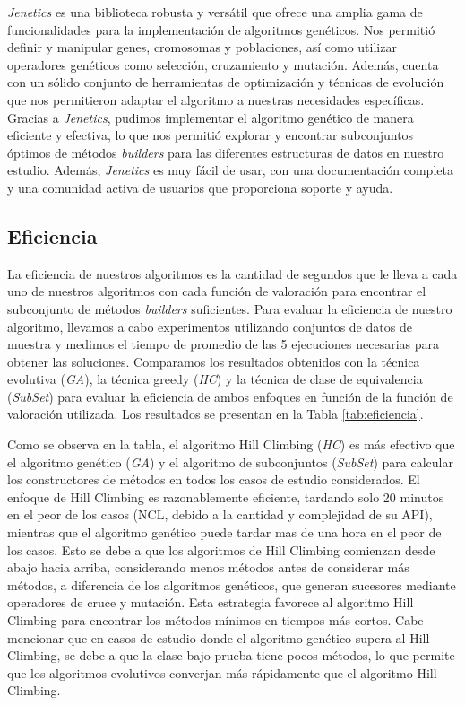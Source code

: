 \emph{Jenetics} es una biblioteca robusta y versátil que ofrece una amplia gama de funcionalidades para la implementación de algoritmos genéticos. Nos permitió definir y manipular genes, cromosomas y poblaciones, así como utilizar operadores genéticos como selección, cruzamiento y mutación. Además, cuenta con un sólido conjunto de herramientas de optimización y técnicas de evolución que nos permitieron adaptar el algoritmo a nuestras necesidades específicas.
Gracias a \emph{Jenetics}, pudimos implementar el algoritmo genético de manera eficiente y efectiva, lo que nos permitió explorar y encontrar subconjuntos óptimos de métodos \emph{builders} para las diferentes estructuras de datos en nuestro estudio. Además, \emph{Jenetics} es muy fácil de usar, con una documentación completa y una comunidad activa de usuarios que proporciona soporte y ayuda. 

\subsection{Eficiencia}
La eficiencia de nuestros algoritmos es la cantidad de segundos que le lleva a cada uno de nuestros algoritmos con cada función de valoración para encontrar el subconjunto de métodos \emph{builders} suficientes. Para evaluar la eficiencia de nuestro algoritmo, llevamos a cabo experimentos utilizando conjuntos de datos de muestra y medimos el tiempo de promedio de las 5 ejecuciones necesarias para obtener las soluciones. Comparamos los resultados obtenidos con la técnica evolutiva (\emph{GA}), la técnica greedy (\emph{HC}) y la técnica de clase de equivalencia (\emph{SubSet}) para evaluar la eficiencia de ambos enfoques en función de la función de valoración utilizada. Los resultados se presentan en la Tabla \ref{tab:eficiencia}.


Como se observa en la tabla, el algoritmo Hill Climbing (\emph{HC}) es más efectivo que el algoritmo genético (\emph{GA}) y el algoritmo de subconjuntos (\emph{SubSet}) para calcular los constructores de métodos en todos los casos de estudio considerados. El enfoque de Hill Climbing es razonablemente eficiente, tardando solo 20 minutos en el peor de los casos (NCL, debido a la cantidad y complejidad de su API), mientras que el algoritmo genético puede tardar mas de una hora en el peor de los casos. Esto se debe a que los algoritmos de Hill Climbing comienzan desde abajo hacia arriba, considerando menos métodos antes de considerar más métodos, a diferencia de los algoritmos genéticos, que generan sucesores mediante operadores de cruce y mutación. Esta estrategia favorece al algoritmo Hill Climbing para encontrar los métodos mínimos en tiempos más cortos. Cabe mencionar que en casos de estudio donde el algoritmo genético supera al Hill Climbing, se debe a que la clase bajo prueba tiene pocos métodos, lo que permite que los algoritmos evolutivos converjan más rápidamente que el algoritmo Hill Climbing.

